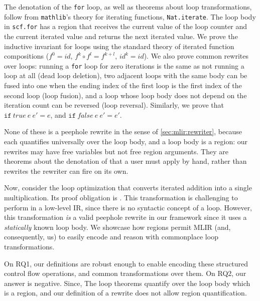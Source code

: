 The denotation of the \texttt{for} loop, as well as theorems about loop transformations, follow from \texttt{mathlib}'s theory for iterating functions, \texttt{Nat.iterate}.
The loop body in \texttt{scf.for} has a region that receives the current value of the loop counter and the current iterated value and returns the next iterated value.
We prove the inductive invariant for loops using the standard theory of iterated function compositions ($f^0 = id$, $f^k \circ f^l = f^{k + l}$, $id^k = id$).
We also prove common rewrites over loops: running a \texttt{for} loop for zero iterations is the same as not running a loop at all (dead loop deletion),
two adjacent loops with the same body can be fused into one when the ending index of the first loop is the first index of the second loop (loop fusion),
and a loop whose loop body does not depend on the iteration count can be reversed (loop reversal).
Similarly, we prove that $\texttt{if}~true~e~e' = e$, and $\texttt{if}~false~e~e' = e'$.

None of these is a peephole rewrite in the sense of \cref{sec:mlir:rewriter},
because each quantifies universally over the loop body, and a loop body is a
region: our rewrites may have free variables but not free region arguments.
They are theorems about the denotation of  that a user must
apply by hand, rather than rewrites the rewriter can fire on its own.

Now, consider the loop optimization that converts iterated addition into a single multiplication.
Its proof obligation is .
This transformation is challenging to perform in a low-level IR, since there is no syntactic concept of a loop.
However, this transformation \emph{is} a valid peephole rewrite in our framework since it uses a \emph{statically} known loop body.
We showcase how regions permit MLIR (and, consequently, us) to easily encode and reason with commonplace loop transformations.

On RQ1, our definitions are robust enough to enable encoding these structured control flow operations,
and common transformations over them.
On RQ2, our answer is negative. Since, The loop theorems quantify over the loop body which is a region,
and our definition of a rewrite does not allow region quantification.

